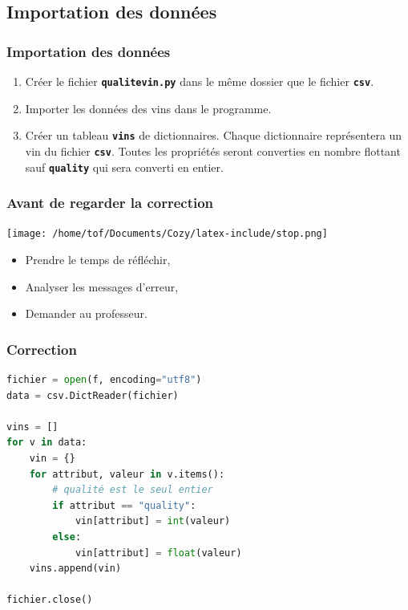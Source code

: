 \documentclass[svgnames,11pt]{beamer}
\begin{document}
\subsection{Importation des données}
\begin{frame}
    \frametitle{Importation des données}
\begin{activite}
\begin{enumerate}
    \item Créer le fichier \textbf{\texttt{qualitevin.py}} dans le même dossier que le fichier \textbf{\texttt{csv}}.
    \item Importer les données des vins dans le programme.
    \item Créer un tableau \textbf{\texttt{vins}} de dictionnaires. Chaque dictionnaire représentera un vin du fichier \textbf{\texttt{csv}}. Toutes les propriétés seront converties en nombre flottant sauf \textbf{\texttt{quality}} qui sera converti en entier.
\end{enumerate}
\end{activite}
    

\end{frame}
\begin{frame}
    \frametitle{Avant de regarder la correction}
\begin{center}
    \centering
    \texttt{[image: /home/tof/Documents/Cozy/latex-include/stop.png]}
    \end{center}
{\Large
    \begin{itemize}
        \item Prendre le temps de réfléchir,
        \item Analyser les messages d'erreur,
        \item Demander au professeur.
    \end{itemize}
}
\end{frame}
\begin{frame}[fragile]
    \frametitle{Correction}

\begin{center}
\begin{lstlisting}[language=Python , basicstyle=\ttfamily\small, xleftmargin=0.2em, xrightmargin=0em]
fichier = open(f, encoding="utf8")
data = csv.DictReader(fichier)

vins = []
for v in data:
    vin = {}
    for attribut, valeur in v.items():
        # qualité est le seul entier
        if attribut == "quality":
            vin[attribut] = int(valeur)
        else:
            vin[attribut] = float(valeur)
    vins.append(vin)

fichier.close()
\end{lstlisting}
\end{center}

\end{frame}
\end{document}
